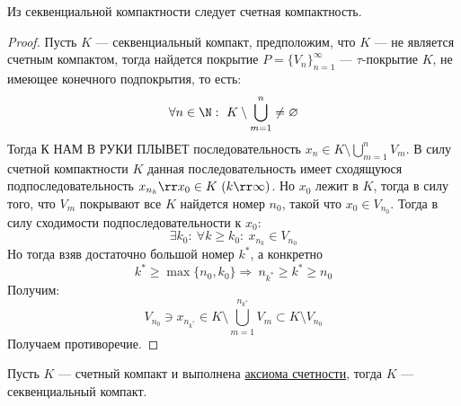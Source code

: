 \begin{claim}
	Из секвенциальной компактности следует счетная компактность. 
\end{claim}
\begin{proof}
	Пусть $K$ --- секвенциальный компакт, предположим, что $K$ --- не является счетным компактом, тогда найдется покрытие $P = \{V_n\}_{n=1}^\infty$ --- $\tau$-покрытие $K$, не имеющее конечного подпокрытия, то есть:
	$$
	\forall n \in \N: \ K \setminus \bigcup_{m=1}^n  \neq \varnothing 
	$$
	Тогда К НАМ В РУКИ ПЛЫВЕТ последовательность $x_n \in K \setminus \bigcup_{m=1}^nV_m$. В силу счетной компактности $K$ данная последовательность имеет сходящуюся подпоследовательность $x_{n_k} \rr x_0 \in K \ (k \rr \infty)$. Но $x_0$ лежит в $K$, тогда в силу того, что $V_m$ покрывают все $K$ найдется номер $n_0$, такой что $x_0 \in V_{n_0}$. Тогда в силу сходимости подпоследовательности к $x_0$:
	$$
	\exists k_0: \ \forall k \geq k_0: \ x_{n_k} \in V_{n_0}
	$$
	Но тогда взяв достаточно большой номер $k^*$, а конкретно 
	$$
	k^* \geq \max\{n_0, k_0\} \Rightarrow \ n_{k^*} \geq k^* \geq n_0
	$$Получим:
	$$
	V_{n_0} \ni x_{n_{k^*}} \in K \setminus \bigcup_{m=1}^{n_{k^*}}V_m \subset K \setminus V_{n_0}
	$$
	Получаем противоречие. 
\end{proof}
\begin{claim}
	Пусть $K$ --- счетный компакт и выполнена \hyperlink{fcs}{аксиома счетности}, тогда $K$ --- секвенциальный компакт.
\end{claim}
